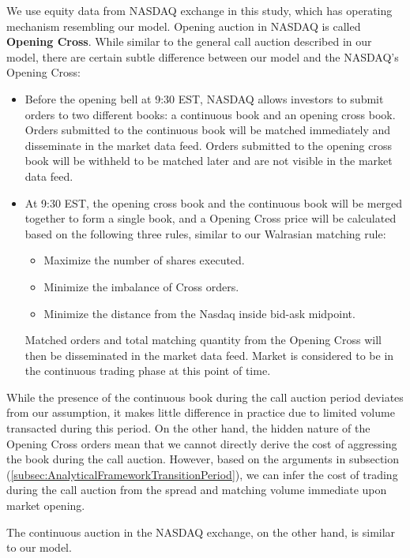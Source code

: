 \documentclass{article}
\begin{document}
We use equity data from NASDAQ exchange in this study, which has operating mechanism resembling our model. Opening auction in NASDAQ is called \textbf{Opening Cross}. While similar to the general call auction described in our model, there are certain subtle difference between our model and the NASDAQ's Opening Cross:
\begin{itemize}
  \item Before the opening bell at 9:30 EST, NASDAQ allows investors to submit orders to two different books: a continuous book and an opening cross book. Orders submitted to the continuous book will be matched immediately and disseminate in the market data feed. Orders submitted to the opening cross book will be withheld to be matched later and are not visible in the market data feed.
  \item At 9:30 EST, the opening cross book and the continuous book will be merged together to form a single book, and a Opening Cross price will be calculated based on the following three rules, similar to our Walrasian matching rule:
        \begin{itemize}
          \item Maximize the number of shares executed.
          \item Minimize the imbalance of Cross orders.
          \item Minimize the distance from the Nasdaq inside bid-ask midpoint.
        \end{itemize}
        Matched orders and total matching quantity from the Opening Cross will then be disseminated in the market data feed. Market is considered to be in the continuous trading phase at this point of time.
\end{itemize}

While the presence of the continuous book during the call auction period deviates from our assumption, it makes little difference in practice due to limited volume transacted during this period. On the other hand, the hidden nature of the Opening Cross orders mean that we cannot directly derive the cost of aggressing the book during the call auction. However, based on the arguments in subsection (\ref{subsec:AnalyticalFrameworkTransitionPeriod}), we can infer the cost of trading during the call auction from the spread and matching volume immediate upon market opening.

The continuous auction in the NASDAQ exchange, on the other hand, is similar to our model.
\end{document}
